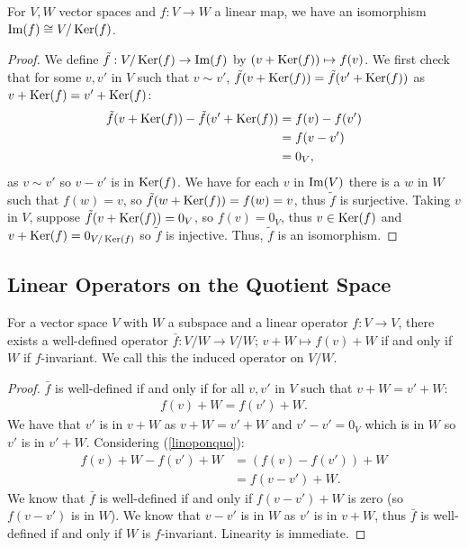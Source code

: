 For $V, W$ vector spaces and $f : V \to W$ a linear map, we have
an isomorphism $\operatorname{Im}(f) \cong V/\operatorname{Ker}(f)$.
\begin{proof}
  We define $\tilde{f} : V/\operatorname{Ker}(f) \to \operatorname{Im}(f)$ by $(v + \operatorname{Ker}(f)) \mapsto f(v)$.
  We first check that for some $v, v'$ in $V$ such that $v \sim v'$,
  $\tilde{f}(v + \operatorname{Ker}(f)) = \tilde{f}(v' + \operatorname{Ker}(f))$ as 
  $v + \operatorname{Ker}(f) = v' + \operatorname{Ker}(f)$: \begin{align*}
    \tilde{f}(v + \operatorname{Ker}(f)) - \tilde{f}(v' + \operatorname{Ker}(f)) &= f(v) - f(v') \\
    &= f(v - v') \\
    &= 0_V,
  \end{align*} as $v \sim v'$ so $v - v'$ is in $\operatorname{Ker}(f)$.
  We have for each $v$ in $\operatorname{Im}(V)$ there is a $w$ in $W$ such that $f(w) = v$,
  so $\tilde{f}(w + \operatorname{Ker}(f)) = f(w) = v$, thus $\tilde{f}$ is surjective. 
  Taking $v$ in $V$, suppose $\tilde{f}(v + \operatorname{Ker}(f)) = 0_V$,
  so $f(v) = 0_V$, thus $v \in \operatorname{Ker}(f)$ and \newline
  $v + \operatorname{Ker}(f) = 0_{V/\operatorname{Ker}(f)}$
  so $\tilde{f}$ is injective. Thus, $\tilde{f}$ is an isomorphism.
\end{proof}

\subsection{Linear Operators on the Quotient Space}

For a vector space $V$ with $W$ a subspace and a linear
operator $f : V \to V$, there exists a well-defined operator
$\bar{f} : V/W \to V/W; \, v + W \mapsto f(v) + W$ if and only if 
$W$ if $f$-invariant. We call this the induced operator on $V/W$.
\begin{proof}
  $\bar{f}$ is well-defined if and only if for all $v, v'$ in $V$
  such that $v + W = v' + W$: \begin{gather} \label{linoponquo}
    f(v) + W = f(v') + W.
  \end{gather} We have that $v'$ is in $v + W$ as $v + W = v' + W$
  and $v' - v' = 0_V$ which is in $W$ so $v'$ is in $v' + W$. 
  Considering (\ref{linoponquo}): \begin{align*}
    f(v) + W - f(v') + W &= (f(v) - f(v')) + W \\
    &= f(v - v') + W.
  \end{align*} We know that $\bar{f}$ is well-defined if and only if
  $f(v - v') + W$ is zero (so $f(v - v')$ is in $W$). We know that
  $v - v'$ is in $W$ as $v'$ is in $v + W$, thus $\bar{f}$ is well-defined 
  if and only if $W$ is $f$-invariant. Linearity is immediate.
\end{proof}

